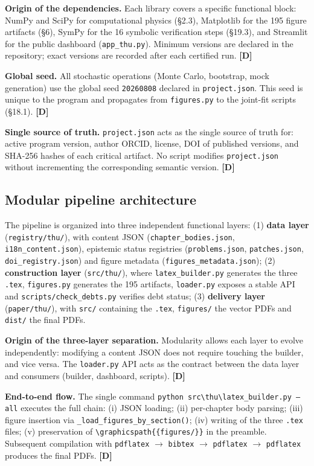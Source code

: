 ﻿\documentclass[11pt,letterpaper]{article}
\begin{document}
\textbf{Origin of the dependencies.} Each library covers a specific functional block: NumPy and SciPy for computational physics (§2.3), Matplotlib for the 195 figure artifacts (§6), SymPy for the 16 symbolic verification steps (§19.3), and Streamlit for the public dashboard (\texttt{app\_thu.py}). Minimum versions are declared in the repository; exact versions are recorded after each certified run. \textbf{[D]}

\textbf{Global seed.} All stochastic operations (Monte Carlo, bootstrap, mock generation) use the global seed \texttt{20260808} declared in \texttt{project.json}. This seed is unique to the program and propagates from \texttt{figures.py} to the joint-fit scripts (§18.1). \textbf{[D]}

\textbf{Single source of truth.} \texttt{project.json} acts as the single source of truth for: active program version, author ORCID, license, DOI of published versions, and SHA-256 hashes of each critical artifact. No script modifies \texttt{project.json} without incrementing the corresponding semantic version. \textbf{[D]}
\subsection{Modular pipeline architecture}
The pipeline is organized into three independent functional layers: (1) \textbf{data layer} (\texttt{registry/thu/}), with content JSON (\texttt{chapter\_bodies.json}, \texttt{i18n\_content.json}), epistemic status registries (\texttt{problems.json}, \texttt{patches.json}, \texttt{doi\_registry.json}) and figure metadata (\texttt{figures\_metadata.json}); (2) \textbf{construction layer} (\texttt{src/thu/}), where \texttt{latex\_builder.py} generates the three \texttt{.tex}, \texttt{figures.py} generates the 195 artifacts, \texttt{loader.py} exposes a stable API and \texttt{scripts/check\_debts.py} verifies debt status; (3) \textbf{delivery layer} (\texttt{paper/thu/}), with \texttt{src/} containing the \texttt{.tex}, \texttt{figures/} the vector PDFs and \texttt{dist/} the final PDFs.

\textbf{Origin of the three-layer separation.} Modularity allows each layer to evolve independently: modifying a content JSON does not require touching the builder, and vice versa. The \texttt{loader.py} API acts as the contract between the data layer and consumers (builder, dashboard, scripts). \textbf{[D]}

\textbf{End-to-end flow.} The single command \texttt{python src\textbackslash thu\textbackslash latex\_builder.py --all} executes the full chain: (i) JSON loading; (ii) per-chapter body parsing; (iii) figure insertion via \texttt{\_load\_figures\_by\_section()}; (iv) writing of the three \texttt{.tex} files; (v) preservation of \texttt{\textbackslash graphicspath\{\{figures/\}\}} in the preamble. Subsequent compilation with \texttt{pdflatex} $\to$ \texttt{bibtex} $\to$ \texttt{pdflatex} $\to$ \texttt{pdflatex} produces the final PDFs. \textbf{[D]}
\end{document}
